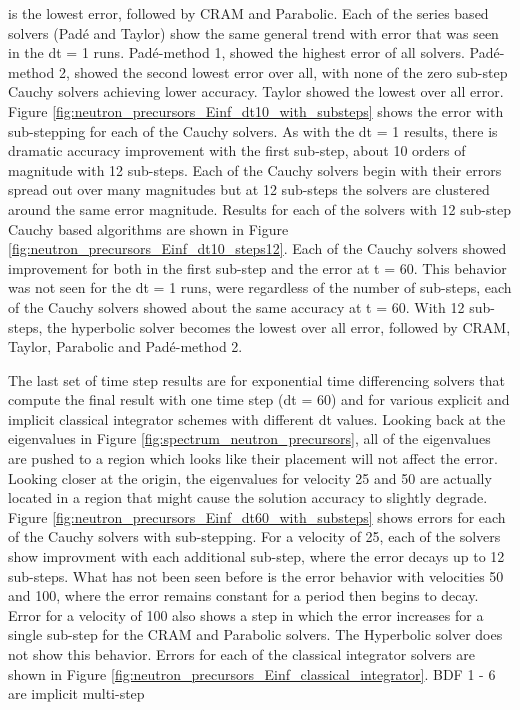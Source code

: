 \noindent is the lowest error, followed by CRAM and Parabolic. Each of the series based solvers (Pad\'e and Taylor) show the same general trend with error that was seen in the dt = 1 runs. Pad\'e-method 1, showed the highest error of all solvers. Pad\'e-method 2, showed the second lowest error over all, with none of the zero sub-step Cauchy solvers achieving lower accuracy. Taylor showed the lowest over all error. Figure \ref{fig:neutron_precursors_Einf_dt10_with_substeps} shows the error with sub-stepping for each of the Cauchy solvers. As with the dt = 1 results, there is dramatic accuracy improvement with the first sub-step, about 10 orders of magnitude with 12 sub-steps. Each of the Cauchy solvers begin with their errors spread out over many magnitudes but at 12 sub-steps the solvers are clustered around the same error magnitude. Results for each of the solvers with 12 sub-step Cauchy based algorithms are shown in Figure \ref{fig:neutron_precursors_Einf_dt10_steps12}. Each of the Cauchy solvers showed improvement for both in the first sub-step and the error at t = 60. This behavior was not seen for the dt = 1 runs, were regardless of the number of sub-steps, each of the Cauchy solvers showed about the same accuracy at t = 60. With 12 sub-steps, the hyperbolic solver becomes the lowest over all error, followed by CRAM, Taylor, Parabolic and Pad\'e-method 2. 

The last set of time step results are for exponential time differencing solvers that compute the final result with one time step (dt = 60) and for various explicit and implicit classical integrator schemes with different dt values. Looking back at the eigenvalues in Figure \ref{fig:spectrum_neutron_precursors}, all of the eigenvalues are pushed to a region which looks like their placement will not affect the error. Looking closer at the origin, the eigenvalues for velocity 25 and 50 are actually located in a region that might cause the solution accuracy to slightly degrade. Figure \ref{fig:neutron_precursors_Einf_dt60_with_substeps} shows errors for each of the Cauchy solvers with sub-stepping. For a velocity of 25, each of the solvers show improvment with each additional sub-step, where the error decays up to 12 sub-steps. What has not been seen before is the error behavior with velocities 50 and 100, where the error remains constant for a period then begins to decay. Error for a velocity of 100 also shows a step in which the error increases for a single sub-step for the CRAM and Parabolic solvers. The Hyperbolic solver does not show this behavior. Errors for each of the classical integrator solvers are shown in Figure \ref{fig:neutron_precursors_Einf_classical_integrator}. BDF 1 - 6 are implicit multi-step 

